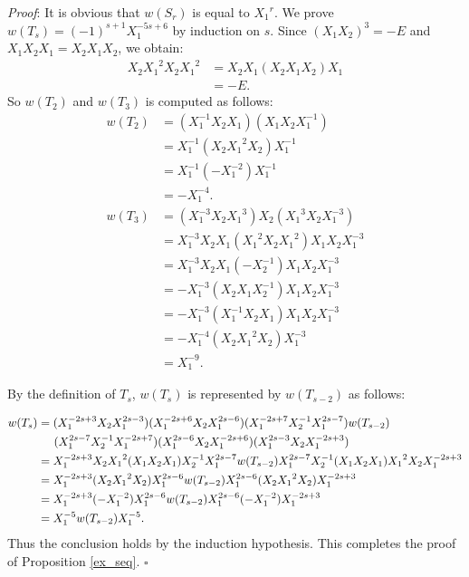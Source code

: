 \documentclass{amsart}
\theoremstyle{plain}
\theoremstyle{definition}
\begin{document}
{\it Proof}: It is obvious that $w(S_r)$ is equal to ${X_1}^r$. 
We prove $w(T_s)=(-1)^{s+1}X_1^{-5s+6}$ by induction on $s$. 
Since $(X_1X_2)^3=-E$ and $X_1X_2X_1=X_2X_1X_2$, we obtain: 
{\allowdisplaybreaks
\begin{align*}
X_2{X_1}^2X_2{X_1}^2 & =X_2X_1(X_2X_1X_2)X_1 \\
& =-E. 
\end{align*}
}
So $w(T_2)$ and $w(T_3)$ is computed as follows: 
{\allowdisplaybreaks
\begin{align*}
w(T_2) & =(X_1^{-1}X_2X_1)(X_1X_2X_1^{-1}) \\
& =X_1^{-1}(X_2{X_1}^2X_2)X_1^{-1} \\
& =X_1^{-1}(-X_1^{-2})X_1^{-1} \\
& =-X_1^{-4}. \\
w(T_3) & =(X_1^{-3}X_2{X_1}^3)X_2({X_1}^3X_2X_1^{-3}) \\
& =X_1^{-3}X_2X_1({X_1}^2X_2{X_1}^2)X_1X_2X_1^{-3} \\
& =X_1^{-3}X_2X_1(-X_2^{-1})X_1X_2X_1^{-3} \\
& =-X_1^{-3}(X_2X_1X_2^{-1})X_1X_2X_1^{-3} \\
& =-X_1^{-3}(X_1^{-1}X_2X_1)X_1X_2X_1^{-3} \\
& =-X_1^{-4}(X_2{X_1}^2X_2)X_1^{-3} \\
& =X_1^{-9}. 
\end{align*}
}

By the definition of $T_s$, $w(T_s)$ is represented by $w(T_{s-2})$ as follows: 

{\allowdisplaybreaks
\begin{align*}
w(T_s) & =(X_1^{-2s+3}X_2X_1^{2s-3})(X_1^{-2s+6}X_2X_1^{2s-6})(X_1^{-2s+7}X_2^{-1}X_1^{2s-7})w(T_{s-2}) \\
& \hspace{1.4em} (X_1^{2s-7}X_2^{-1}X_1^{-2s+7})(X_1^{2s-6}X_2X_1^{-2s+6})(X_1^{2s-3}X_2X_1^{-2s+3}) \\
& =X_1^{-2s+3}X_2{X_1}^2(X_1X_2X_1)X_2^{-1}X_1^{2s-7}w(T_{s-2})X_1^{2s-7}X_2^{-1}(X_1X_2X_1){X_1}^2X_2X_1^{-2s+3} \\
& =X_1^{-2s+3}(X_2{X_1}^2X_2)X_1^{2s-6}w(T_{s-2})X_1^{2s-6}(X_2{X_1}^2X_2)X_1^{-2s+3} \\
& =X_1^{-2s+3}(-X_1^{-2})X_1^{2s-6}w(T_{s-2})X_1^{2s-6}(-X_1^{-2})X_1^{-2s+3} \\
& =X_1^{-5}w(T_{s-2})X_1^{-5}. 
\end{align*}
}
\noindent
Thus the conclusion holds by the induction hypothesis. 
This completes the proof of Proposition \ref{ex_seq}.  \hfill $\square$
\end{document}
